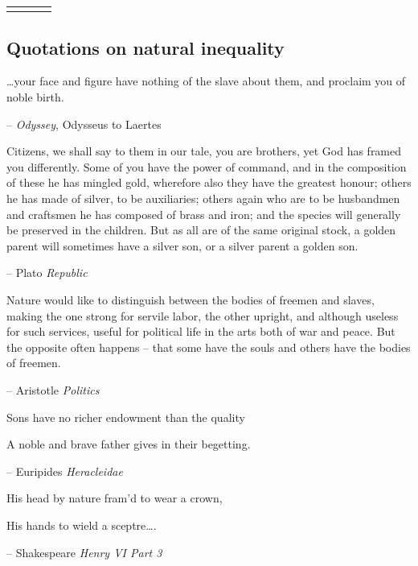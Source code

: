\documentclass[
  12pt,
]{article}
\theoremstyle{definition}
\theoremstyle{definition}
\theoremstyle{definition}
\theoremstyle{definition}
\theoremstyle{remark}
\begin{document}
\begin{table}[ht]
\begin{centerbox}
\begin{threeparttable}
\begin{tabularx}{0.8\textwidth}{p{} p{} p{} p{}}
\hhline{}
\arrayrulecolor{black}
\end{tabularx}
\end{threeparttable}\par\end{centerbox}

\end{table}
 

\FloatBarrier

\clearpage

\hypertarget{quotations-on-natural-inequality}{%
\subsection{Quotations on natural inequality}\label{quotations-on-natural-inequality}}

\ldots your face and figure have nothing of the slave about them, and
proclaim you of noble birth.

-- \emph{Odyssey}, Odysseus to Laertes

Citizens, we shall say to them in our tale, you are brothers, yet God
has framed you differently. Some of you have the power of command, and
in the composition of these he has mingled gold, wherefore also they
have the greatest honour; others he has made of silver, to be
auxiliaries; others again who are to be husbandmen and craftsmen he has
composed of brass and iron; and the species will generally be preserved
in the children. But as all are of the same original stock, a golden
parent will sometimes have a silver son, or a silver parent a golden
son.

-- Plato \emph{Republic}

Nature would like to distinguish between the bodies of freemen and
slaves, making the one strong for servile labor, the other upright, and
although useless for such services, useful for political life in the
arts both of war and peace. But the opposite often happens -- that some
have the souls and others have the bodies of freemen.

-- Aristotle \emph{Politics}

Sons have no richer endowment than the quality

A noble and brave father gives in their begetting.

-- Euripides \emph{Heracleidae}

His head by nature fram'd to wear a crown,

His hands to wield a sceptre\ldots.

-- Shakespeare \emph{Henry VI Part 3}
\end{document}
